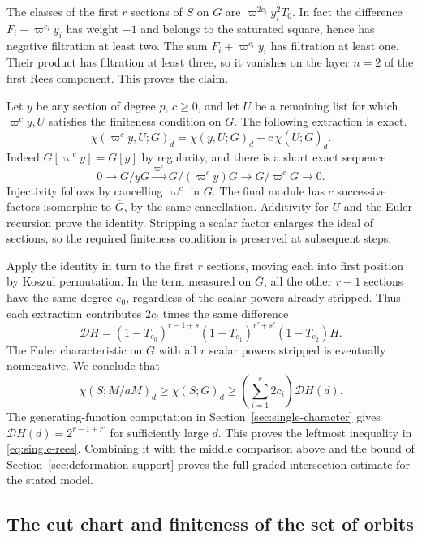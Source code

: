 The classes of the first \(r\) sections of \(S\) on \(G\) are
\(\varpi^{2c_i} y_i^2 T_0\). In fact the difference
\(F_i-\varpi^{c_i}y_i\) has weight \(-1\) and belongs to the
saturated square, hence has negative filtration at least two.
The sum \(F_i+\varpi^{c_i}y_i\) has filtration at least one.
Their product has filtration at least three, so it vanishes on the
layer \(n=2\) of the first Rees component. This proves the claim.

Let \(y\) be any section of degree \(p\), \(c\ge0\), and let \(U\)
be a remaining list for which \(\varpi^c y,U\) satisfies the
finiteness condition on \(G\). The following extraction is exact.
\[
   \chi(\varpi^c y,U;G)_d
       =\chi(y,U;G)_d+c\,\chi(U;\overline G)_d .
\]
Indeed \(G[\varpi^c y]=G[y]\) by regularity, and there is a short
exact sequence
\[
   0\longrightarrow G/yG
       \xrightarrow{\ \varpi^c\ }G/(\varpi^c y)G
       \longrightarrow G/\varpi^cG\longrightarrow0 .
\]
Injectivity follows by cancelling \(\varpi^c\) in \(G\).
The final module has \(c\) successive factors isomorphic to
\(\overline G\), by the same cancellation. Additivity for \(U\)
and the Euler recursion prove the identity. Stripping a scalar
factor enlarges the ideal of sections, so the required finiteness
condition is preserved at subsequent steps.

Apply the identity in turn to the first \(r\) sections, moving each
into first position by Koszul permutation. In the term measured on
\(\overline G\), all the other \(r-1\) sections have the same degree
\(e_0\), regardless of the scalar powers already stripped. Thus each
extraction contributes \(2c_i\) times the same difference
\[
        \mathcal D H=(1-T_{e_0})^{r-1+s}
                        (1-T_{e_1})^{r'+s'}(1-T_{e_2})H.
\]
The Euler characteristic on \(G\) with all \(r\) scalar powers
stripped is eventually nonnegative. We conclude that
\[
 \chi(S;M/aM)_d\ge \chi(S;G)_d
                \ge\left(\sum_{i=1}^r2c_i\right)\mathcal D H(d).
\]
The generating-function computation in
Section~\ref{sec:single-character} gives
\(\mathcal DH(d)=2^{r-1+r'}\) for sufficiently large \(d\).
This proves the leftmost inequality in \eqref{eq:single-rees}.
Combining it with the middle comparison above and the bound of
Section~\ref{sec:deformation-support} proves the full graded
intersection estimate for the stated model.

\subsection{The cut chart and finiteness of the set of orbits}

